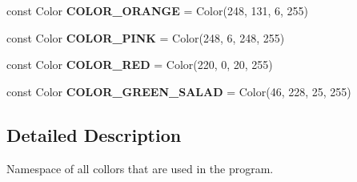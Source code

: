\begin{DoxyCompactItemize}
\item 
\mbox{\label{namespacecolors_a41e22bd782763f556068f796b7c4718c}} 
const Color {\bfseries C\+O\+L\+O\+R\+\_\+\+O\+R\+A\+N\+GE} = Color(248, 131, 6, 255)
\item 
\mbox{\label{namespacecolors_a27e54ef22e656d1b7b1a4d17d2e05525}} 
const Color {\bfseries C\+O\+L\+O\+R\+\_\+\+P\+I\+NK} = Color(248, 6, 248, 255)
\item 
\mbox{\label{namespacecolors_af12a9b629eb88c489548cad1444e5087}} 
const Color {\bfseries C\+O\+L\+O\+R\+\_\+\+R\+ED} = Color(220, 0, 20, 255)
\item 
\mbox{\label{namespacecolors_af05abe142958b6111c2187e60f724e46}} 
const Color {\bfseries C\+O\+L\+O\+R\+\_\+\+G\+R\+E\+E\+N\+\_\+\+S\+A\+L\+AD} = Color(46, 228, 25, 255)
\end{DoxyCompactItemize}


\subsection{Detailed Description}
Namespace of all collors that are used in the program. 
